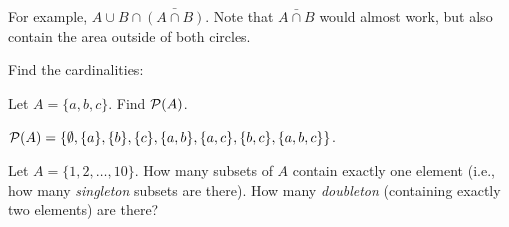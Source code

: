 \begin{questions}
  \begin{answer}
    For example, $A \cup B \cap \bar{(A \cap B)}$.  Note that $\bar{A \cap B}$ would almost work, but also contain the area outside of both circles.
  \end{answer}

  

\question Find the cardinalities:

  \begin{answer}
  \end{answer}


  
  
\question Let $A = \{a, b, c\}$.  Find $\mathcal P(A)$.

  \begin{answer}
    $\mathcal P(A) = \{\emptyset, \{a\}, \{b\}, \{c\}, \{a,b\}, \{a,c\}, \{b,c\}, \{a,b,c\}\}$.
  \end{answer}

  
  

\question Let $A = \{1,2,\ldots, 10\}$.  How many subsets of $A$ contain exactly one element (i.e., how many {\em singleton} subsets are there).  How many {\em doubleton} (containing exactly two elements) are there?


\end{questions}
